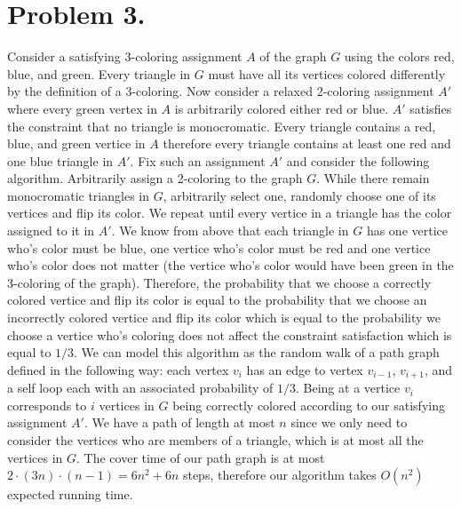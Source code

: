 \documentclass[12pt]{article}
\begin{document}
\pagestyle{plain}
\titleformat{\subsection}[runin]
  {\normalfont\large\bfseries}{\thesubsection}{1em}{}
\titleformat{\subsubsection}[runin]
  {\normalfont\large\bfseries}{\thesubsubsection}{1em}{}

\section*{Problem 3.}
Consider a satisfying 3-coloring assignment $A$ of the graph $G$ using the
colors red, blue, and green. Every triangle in $G$ must have all its vertices
colored differently by the definition of a 3-coloring. Now consider a relaxed
2-coloring assignment $A'$ where every green vertex in $A$ is arbitrarily
colored either red or blue. $A'$ satisfies the constraint that no triangle is
monocromatic. Every triangle contains a red, blue, and green vertice in $A$
therefore every triangle contains at least one red and one blue triangle in $A'$.
Fix such an assignment $A'$ and consider the following algorithm. Arbitrarily
assign a 2-coloring to the graph $G$. While there remain monocromatic triangles
in $G$, arbitrarily select one, randomly choose one of
its vertices and flip its color. We repeat until every vertice in a triangle has
the color assigned to it in $A'$. We know from above that each triangle in $G$
has one vertice who's color must be blue, one vertice who's
color must be red and one vertice who's color does not matter (the vertice who's
color would have been green in the 3-coloring of the graph). Therefore, the
probability that we choose a correctly colored vertice and flip its color is
equal to the probability that we choose an incorrectly colored vertice and flip
its color which is equal to the probability we choose a vertice who's coloring does
not affect the constraint satisfaction which is equal to $1/3$. We can model
this algorithm as the random walk of a path graph defined in the following way:
each vertex $v_i$ has an edge to vertex $v_{i-1}$, $v_{i+1}$, and a self loop
each with an associated probability of $1/3$. Being at a vertice $v_i$ corresponds
to $i$ vertices in $G$ being correctly colored according to our satisfying assignment $A'$.
We have a path of length at most $n$ since we only need to consider the vertices who are
members of a triangle, which is at most all the vertices in $G$. The cover time
of our path graph is at most $2\cdot(3n)\cdot(n-1) = 6n^2+6n$ steps, therefore
our algorithm takes $O(n^2)$ expected running time.
\end{document}
